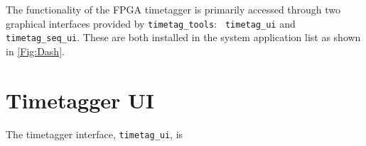 The functionality of the FPGA timetagger is primarily accessed through
two graphical interfaces provided by {\tt timetag\_tools}: {\tt
 timetag\_ui} and {\tt timetag\_seq\_ui}. These are both installed in
the system application list as shown in \ref{Fig:Dash}.

\section{Timetagger UI}

The timetagger interface, {\tt timetag\_ui}, is
